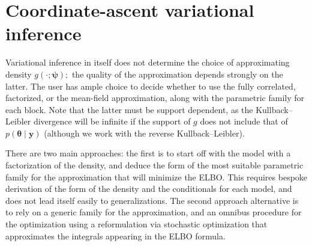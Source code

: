 \documentclass[
  11pt,
  letterpaper,
]{scrbook}
\theoremstyle{plain}
\theoremstyle{plain}
\theoremstyle{definition}
\theoremstyle{definition}
\theoremstyle{definition}
\theoremstyle{plain}
\theoremstyle{remark}
\begin{document}
\section{Coordinate-ascent variational
inference}\label{coordinate-ascent-variational-inference}

Variational inference in itself does not determine the choice of
approximating density \(g(\cdot; \boldsymbol{\psi});\) the quality of
the approximation depends strongly on the latter. The user has ample
choice to decide whether to use the fully correlated, factorized, or the
mean-field approximation, along with the parametric family for each
block. Note that the latter must be support dependent, as the
Kullback--Leibler divergence will be infinite if the support of \(g\)
does not include that of \(p(\boldsymbol{\theta} \mid \boldsymbol{y})\)
(although we work with the reverse Kullback--Leibler).

There are two main approaches: the first is to start off with the model
with a factorization of the density, and deduce the form of the most
suitable parametric family for the approximation that will minimize the
ELBO. This requires bespoke derivation of the form of the density and
the conditionals for each model, and does not lead itself easily to
generalizations. The second approach alternative is to rely on a generic
family for the approximation, and an omnibus procedure for the
optimization using a reformulation via stochastic optimization that
approximates the integrals appearing in the ELBO formula.
\end{document}
